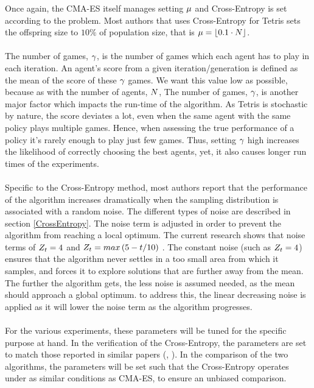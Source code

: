 Once again, the CMA-ES itself manages setting $\mu$ and Cross-Entropy
is set according to the problem. Most authors that uses Cross-Entropy for Tetris
sets the offspring size to $10\%$ of population size, that is 
$\mu = \lfloor 0.1 \cdot N \rfloor $.\\
\\
The number of games, $\gamma$, is the number of games  which each agent 
has to play in each iteration. An agent's score from a given
iteration/generation is defined as the mean of the score of these 
$\gamma$ games.
We want this value low as possible, because as with the number of
agents, $N$, The number of games, $\gamma$, 
is another major factor which 
impacts the run-time of the algorithm.
As Tetris is stochastic by nature, the score deviates a lot, even when the
same agent with the same policy plays multiple games. Hence, when assessing the true
performance of a policy it's rarely enough to play just few games. Thus, setting 
$\gamma$ high increases the likelihood of correctly choosing the best 
agents, yet, it also causes longer run times of the experiments.\\
\\
Specific to the Cross-Entropy method, most authors report that the performance of the 
algorithm increases dramatically when the sampling distribution is associated with
a random noise. The different types of noise are described in section \ref{CrossEntropy}.
The noise term is adjusted in order to prevent the algorithm from reaching a local optimum.
The current research shows that noise terms of $Z_t = 4$ and 
$Z_t = max \left( 5 - t / 10 \right)$ \citep{thiery:09}.
The constant noise (such as $Z_t = 4$) ensures that the algorithm
never settles in a too small area from which it samples, and forces it to explore
solutions that are further away from the mean. The further the algorithm gets, 
the less noise is assumed needed, as the mean should approach a global optimum. to
address this, the linear decreasing noise is applied as it will lower the noise term
as the algorithm progresses.\\
\\
For the various experiments, these parameters will be tuned for the specific purpose 
at hand. In the verification of the Cross-Entropy, the parameters are set 
to match those reported in similar papers (\cite{thiery:09}, \cite{szita:06}).
In the comparison of the two algorithms, the parameters will be set such that 
the Cross-Entropy operates under as similar conditions as CMA-ES, to ensure an unbiased 
comparison.


